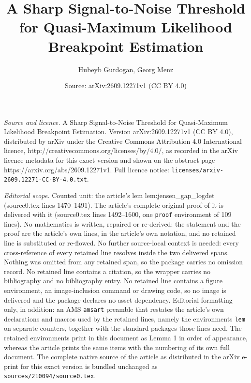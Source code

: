 \documentclass[10pt,a4paper]{amsart}
\title{A Sharp Signal-to-Noise Threshold for Quasi-Maximum Likelihood Breakpoint Estimation}
\author{Hubeyb Gurdogan, Georg Menz}
\date{Source: arXiv:2609.12271v1 (CC BY 4.0)}
\begin{document}
\maketitle

\noindent\emph{Source and licence.} A Sharp Signal-to-Noise Threshold for Quasi-Maximum Likelihood Breakpoint Estimation. Version arXiv:2609.12271v1 (CC BY 4.0), distributed by arXiv under the Creative Commons Attribution 4.0 International licence, http://creativecommons.org/licenses/by/4.0/, as recorded in the arXiv licence metadata for this exact version and shown on the abstract page https://arxiv.org/abs/2609.12271v1. Full licence notice: \texttt{licenses/arxiv-2609.12271-CC-BY-4.0.txt}.\par\smallskip

\noindent\textit{Editorial scope.} Counted unit: the article's lem lem:jensen\_gap\_logdet (source0.tex lines 1470--1491). The article's complete original proof of it is delivered with it (source0.tex lines 1492--1600, one \texttt{proof} environment of 109 lines). No mathematics is written, repaired or re-derived: the statement and the proof are the article's own lines, in the article's own notation, and no retained line is substituted or re-flowed.  No further source-local context is needed: every cross-reference of every retained line resolves inside the two delivered spans.  Nothing was omitted from any retained span, so the package carries no omission record.  No retained line contains a citation, so the wrapper carries no bibliography and no bibliography entry.  No retained line contains a figure environment, an image-inclusion command or drawing code, so no image is delivered and the package declares no asset dependency.  Editorial formatting only, in addition: an AMS \texttt{amsart} preamble that restates the article's own declarations and macros used by the retained lines, namely the environments \texttt{lem} on separate counters, together with the standard packages those lines need.  The retained environments print in this document as Lemma 1 in order of appearance, whereas the article prints the same items with the numbering of its own full document.  The complete native source of the article as distributed in the arXiv e-print for this exact version is bundled unchanged as \texttt{sources/210094/source0.tex}.
\end{document}
